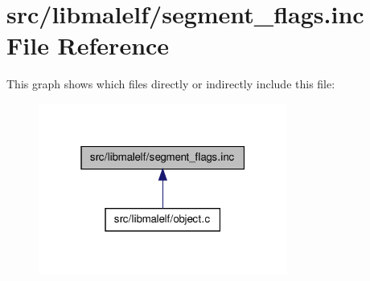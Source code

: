 \hypertarget{segment__flags_8inc}{
\section{src/libmalelf/segment\_\-flags.inc File Reference}
\label{segment__flags_8inc}
}
This graph shows which files directly or indirectly include this file:\nopagebreak
\begin{figure}[H]
\begin{center}
\leavevmode
\includegraphics[width=232pt]{segment__flags_8inc__dep__incl}
\end{center}
\end{figure}
